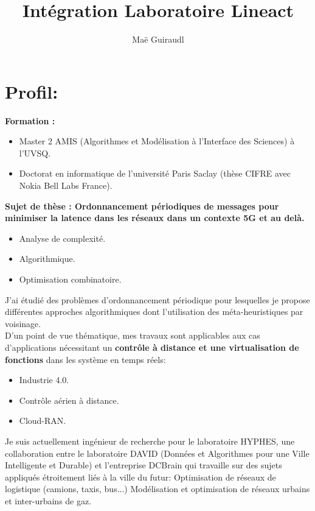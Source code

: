 \documentclass[a4paper,10pt]{article}
\title{Intégration Laboratoire Lineact}
\author{Maë Guiraudl}
\begin{document}
 
\maketitle

\section{Profil:}

\textbf{Formation :}
\begin{itemize}
\item Master 2 AMIS (Algorithmes et Modélisation à l’Interface des Sciences) à l’UVSQ. 
\item Doctorat en informatique de l’université Paris Saclay (thèse CIFRE avec Nokia Bell Labs France).
\end{itemize}

\textbf{Sujet de thèse : Ordonnancement périodiques de messages pour minimiser la latence dans les réseaux dans un contexte 5G et au delà.}
\begin{itemize}
\item Analyse de complexité.
\item Algorithmique.
\item Optimisation combinatoire.
\end{itemize}
 J'ai étudié des problèmes d'ordonnancement périodique pour lesquelles je propose différentes approches algorithmiques dont l'utilisation des méta-heuristiques par voisinage.
\\
 
D'un point de vue thématique, mes travaux sont applicables aux cas d'applications nécessitant un \textbf{contrôle à distance et une virtualisation de fonctions} dans les système en temps réels: 
 \begin{itemize}
\item Industrie 4.0.
\item Contrôle aérien à distance.
\item Cloud-RAN.
 
\end{itemize}

        Je suis actuellement ingénieur de recherche pour le laboratoire HYPHES, une collaboration entre le laboratoire DAVID (Données et Algorithmes pour une Ville Intelligente et Durable) et l’entreprise DCBrain qui travaille sur des sujets appliqués étroitement liés à la ville du futur:
Optimisation de réseaux de logistique (camions, taxis, bus...) Modélisation et optimisation de réseaux urbains et inter-urbains de gaz.
\end{document}
